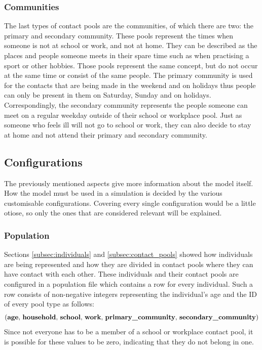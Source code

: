 \subsubsection{Communities}
The last types of contact pools are the communities, of which there are two: the primary and secondary community. These pools represent the times when someone is not at school or work, and not at home. They can be described as the places and people someone meets in their spare time such as when practising a sport or other hobbies. Those pools represent the same concept, but do not occur at the same time or consist of the same people. The primary community is used for the contacts that are being made in the weekend and on holidays thus people can only be present in them on Saturday, Sunday and on holidays. Correspondingly, the secondary community represents the people someone can meet on a regular weekday outside of their school or workplace pool. Just as someone who feels ill will not go to school or work, they can also decide to stay at home and not attend their primary and secondary community.

\subsection{Configurations}
\label{subsec:configurations}
The previously mentioned aspects give more information about the model itself. How the model must be used in a simulation is decided by the various customisable configurations. Covering every single configuration would be a little otiose, so only the ones that are considered relevant will be explained.

\subsubsection{Population}
Sections \ref{subsec:individuals} and \ref{subsec:contact_pools} showed how individuals are being represented and how they are divided in contact pools where they can have contact with each other. These individuals and their contact pools are configured in a population file which contains a row for every individual. Such a row consists of non-negative integers representing the individual's age and the ID of every pool type as follows:
$$\textrm{(\textbf{age}, \textbf{household}, \textbf{school}, \textbf{work}, \textbf{primary\_community}, \textbf{secondary\_community})}$$
Since not everyone has to be a member of a school or workplace contact pool, it is possible for these values to be zero, indicating that they do not belong in one.

